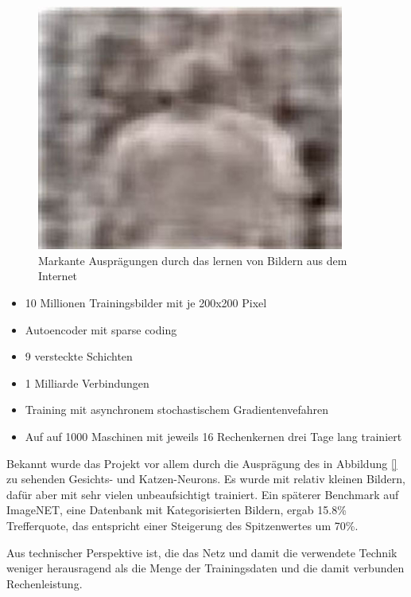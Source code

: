\begin{figure}
{\begin{minipage}{0.33\textwidth}
	\includegraphics[width=0.9\textwidth]{images/neuron-body.jpg}\end{minipage}}
\caption{Markante Ausprägungen durch das lernen von Bildern aus dem Internet}
\label{fig:neurons-google}
\end{figure}

\begin{itemize}
\item 10 Millionen Trainingsbilder mit je 200x200 Pixel
\item Autoencoder mit sparse coding
\item 9 versteckte Schichten
\item 1 Milliarde Verbindungen
\item Training mit asynchronem stochastischem Gradientenvefahren
\item Auf auf 1000 Maschinen mit jeweils 16 Rechenkernen drei Tage lang trainiert
\end{itemize}

Bekannt wurde das Projekt vor allem durch die Ausprägung des in Abbildung \ref{} zu sehenden Gesichts- und Katzen-Neurons.
Es wurde mit relativ kleinen Bildern, dafür aber mit sehr vielen unbeaufsichtigt trainiert. Ein späterer Benchmark auf ImageNET, eine Datenbank mit Kategorisierten Bildern, ergab 15.8\% Trefferquote, das entspricht einer Steigerung des Spitzenwertes um 70\%.

Aus technischer Perspektive ist, die das Netz und damit die verwendete Technik weniger herausragend als die Menge der Trainingsdaten und die damit verbunden Rechenleistung.

